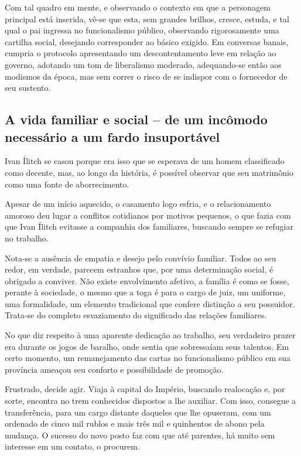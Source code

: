 \documentclass[12pt]{extarticle}
\begin{document}
Com tal quadro em mente, e observando o contexto em que a personagem
principal está inserida, vê-se que esta, sem grandes brilhos, cresce, estuda, e tal qual o pai ingressa no funcionalismo
público, observando rigorosamente uma cartilha social, desejando corresponder ao básico exigido. Em conversas banais, cumpria o protocolo
apresentando um descontentamento leve em relação ao governo, adotando um
tom de liberalismo moderado, adequando-se então aos modismos da época,
mas sem correr o risco de se indispor com o fornecedor de seu sustento.

\subsection{A vida familiar e social -- de um incômodo necessário a um fardo
insuportável}

Ivan Ílitch se casou porque era isso que se esperava de um homem
classificado como decente, mas, ao longo da história, é possível observar que seu
matrimônio como uma fonte de aborrecimento.

Apesar de um início aquecido, o casamento logo esfria, e o
relacionamento amoroso deu lugar a conflitos cotidianos por motivos
pequenos, o que fazia com que Ivan Ílitch evitasse a companhia dos
familiares, buscando sempre se refugiar no trabalho.

Nota-se a ausência de empatia e desejo pelo convívio familiar. Todos
ao seu redor, em verdade, parecem estranhos que, por uma determinação
social, é obrigado a conviver. Não existe envolvimento afetivo, a
família é como se fosse, perante à sociedade, o mesmo que a toga é para
o cargo de juiz, um uniforme, uma formalidade, um elemento tradicional
que confere distinção a seu possuidor. Trata-se do completo esvaziamento do significado das relações
familiares.

No que diz respeito à uma aparente dedicação ao trabalho, seu
verdadeiro prazer era durante os jogos de baralho, onde sentia que sobressaíam seus talentos. Em certo momento, um remanejamento das cartas no funcionalismo público em sua
província ameaçou seu conforto e possibilidade de promoção.

Frustrado, decide agir. Viaja à capital do Império, buscando realocação
e, por sorte, encontra no trem conhecidos dispostos a lhe auxiliar. Com
isso, consegue a transferência, para um cargo distante daqueles que lhe
opuseram, com um ordenado de cinco mil rublos e mais três mil e
quinhentos de abono pela mudança. O sucesso do novo posto faz com que até parentes, há muito sem interesse
em um contato, o procurem.
\end{document}
